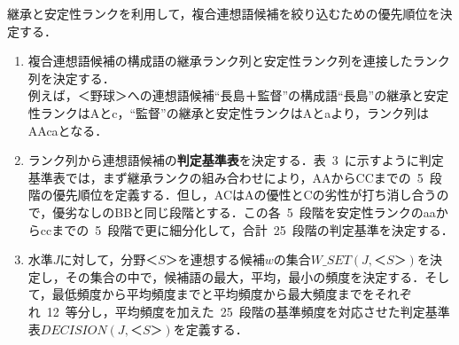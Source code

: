 継承と安定性ランクを利用して，複合連想語候補を絞り込むための優先順位を決定する．

\renewcommand{\labelenumi}{}
\begin{enumerate}
\item 複合連想語候補の構成語の継承ランク列と安定性ランク列を連接したランク列を決定する．\\
例えば，＜野球＞への連想語候補``長島＋監督''の構成語``長島''の継承と安定性ランクはAとc，``監督''の継承と安定性ランクはAとaより，ランク列はAAcaとなる．
\item ランク列から連想語候補の{\bf 判定基準表}を決定する．表~3~に示すように判定基準表では，まず継承ランクの組み合わせにより，AAからCCまでの~5~段階の優先順位を定義する．但し，ACはAの優性とCの劣性が打ち消し合うので，優劣なしのBBと同じ段階とする．この各~5~段階を安定性ランクのaaからccまでの~5~段階で更に細分化して，合計~25~段階の判定基準を決定する．
\item 水準$J$に対して，分野$＜S＞$を連想する候補$w$の集合$W\_SET(J,＜S＞)$\mbox{を決定し，}その集合の中で，候補語の最大，平均，最小の頻度を決定する．そして，最低頻度から平均頻度までと平均頻度から最大頻度までをそれぞれ~12~等分し，平均頻度を加えた~25~段階の基準頻度を対応させた判定基準表$DECISION(J,＜S＞)$を定義する．
\end{enumerate}


